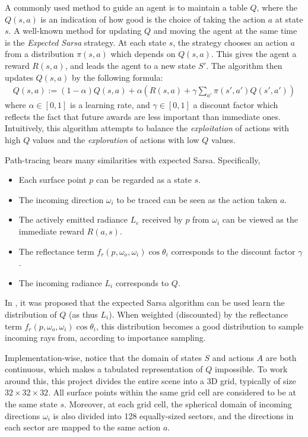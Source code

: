 A commonly used method to guide an agent is to maintain a table $Q$, where the $Q(s,a)$ is an indication of how good is the choice of taking the action $a$ at state $s$. A well-known method for updating $Q$ and moving the agent at the same time is the \textit{Expected Sarsa} strategy. At each state $s$, the strategy chooses an action $a$ from a distribution $\pi(s,a)$ which depends on $Q(s,a)$. This gives the agent a reward $R(s,a)$, and leads the agent to a new state $S'$. The algorithm then updates $Q(s,a)$ by the following formula:
\begin{align*}
    Q(s,a) := (1-\alpha) Q(s,a) + \alpha  \left(R(s,a)+\gamma \sum_{a'} \pi(s',a')Q(s',a') \right)
\end{align*}
where $\alpha\in [0,1]$ is a learning rate, and $\gamma\in [0,1]$ a discount factor which reflects the fact that future awards are less important than immediate ones. Intuitively, this algorithm attempts to balance the \textit{exploitation} of actions with high $Q$ values and the \textit{exploration} of actions with low $Q$ values.

Path-tracing bears many similarities with expected Sarsa. Specifically,
\begin{itemize}
    \item Each surface point $p$ can be regarded as a state $s$.
    \item The incoming direction $\omega_i$ to be traced can be seen as the action taken $a$.
    \item The actively emitted radiance $L_e$ received by $p$ from $\omega_i$ can be viewed as the immediate reward $R(a,s)$.
    \item The reflectance term $f_r(p,\omega_o,\omega_i)\cos \theta_i$ corresponds to the discount factor $\gamma$.
    \item The incoming radiance $L_i$ corresponds to $Q$.
\end{itemize}
In \cite{RLPT}, it was proposed that the expected Sarsa algorithm can be used learn the distribution of $Q$ (as thus $L_i$). When weighted (discounted) by the reflectance term $f_r(p,\omega_o,\omega_i)\cos \theta_i$, this distribution becomes a good distribution to sample incoming rays from, according to importance sampling.

Implementation-wise, notice that the domain of states $S$ and actions $A$ are both continuous, which makes a tabulated representation of $Q$ impossible. To work around this, this project divides the entire scene into a 3D grid, typically of size $32\times 32\times 32$. All surface points within the same grid cell are considered to be at the same state $s$. Moreover, at each grid cell, the spherical domain of incoming directions $\omega_i$ is also divided into 128 equally-sized sectors, and the directions in each sector are mapped to the same action $a$. 

